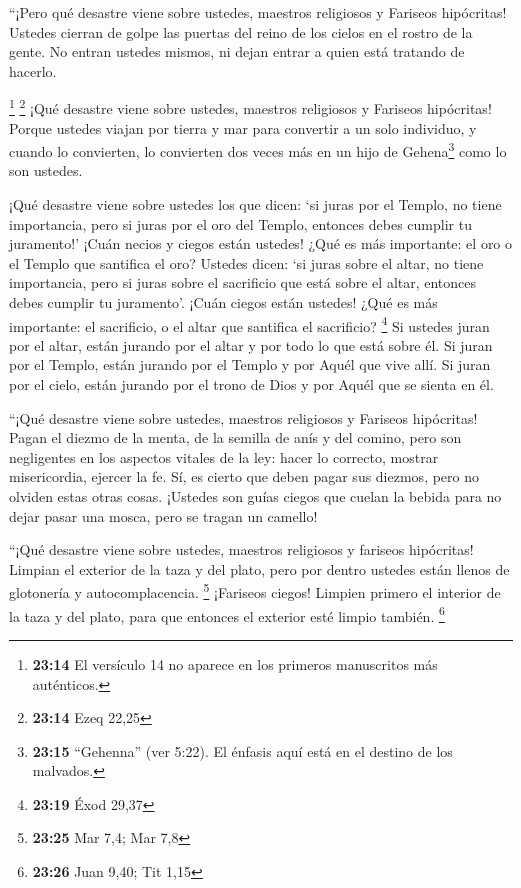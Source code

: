  ``¡Pero qué desastre viene sobre ustedes, maestros
religiosos y Fariseos hipócritas! Ustedes cierran de golpe las puertas
del reino de los cielos en el rostro de la gente. No entran ustedes
mismos, ni dejan entrar a quien está tratando de hacerlo.

 \footnote{\textbf{23:14} El versículo 14 no aparece en
  los primeros manuscritos más auténticos.} \footnote{\textbf{23:14}
  Ezeq 22,25}  ¡Qué desastre viene sobre ustedes,
maestros religiosos y Fariseos hipócritas! Porque ustedes viajan por
tierra y mar para convertir a un solo individuo, y cuando lo convierten,
lo convierten dos veces más en un hijo de Gehena\footnote{\textbf{23:15}
  ``Gehenna'' (ver 5:22). El énfasis aquí está en el destino de los
  malvados.} como lo son ustedes.

 ¡Qué desastre viene sobre ustedes los que dicen: `si
juras por el Templo, no tiene importancia, pero si juras por el oro del
Templo, entonces debes cumplir tu juramento!' ¡Cuán necios y ciegos
están ustedes!  ¿Qué es más importante: el oro o el
Templo que santifica el oro?  Ustedes dicen: `si juras
sobre el altar, no tiene importancia, pero si juras sobre el sacrificio
que está sobre el altar, entonces debes cumplir tu juramento'.
 ¡Cuán ciegos están ustedes! ¿Qué es más importante: el
sacrificio, o el altar que santifica el sacrificio? \footnote{\textbf{23:19}
  Éxod 29,37}  Si ustedes juran por el altar, están
jurando por el altar y por todo lo que está sobre él.  Si
juran por el Templo, están jurando por el Templo y por Aquél que vive
allí.  Si juran por el cielo, están jurando por el trono
de Dios y por Aquél que se sienta en él.

 ``¡Qué desastre viene sobre ustedes, maestros religiosos
y Fariseos hipócritas! Pagan el diezmo de la menta, de la semilla de
anís y del comino, pero son negligentes en los aspectos vitales de la
ley: hacer lo correcto, mostrar misericordia, ejercer la fe. Sí, es
cierto que deben pagar sus diezmos, pero no olviden estas otras cosas.
 ¡Ustedes son guías ciegos que cuelan la bebida para no
dejar pasar una mosca, pero se tragan un camello!

 ``¡Qué desastre viene sobre ustedes, maestros religiosos
y fariseos hipócritas! Limpian el exterior de la taza y del plato, pero
por dentro ustedes están llenos de glotonería y autocomplacencia.
\footnote{\textbf{23:25} Mar 7,4; Mar 7,8}  ¡Fariseos
ciegos! Limpien primero el interior de la taza y del plato, para que
entonces el exterior esté limpio también. \footnote{\textbf{23:26} Juan
  9,40; Tit 1,15}

